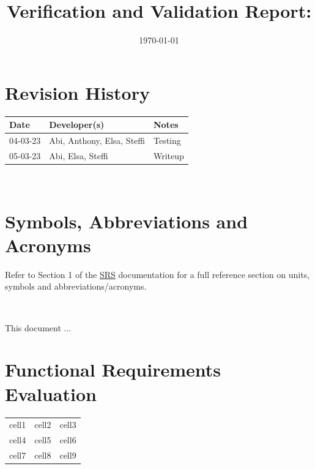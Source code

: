\documentclass[12pt, titlepage]{article}
\begin{document}
\title{Verification and Validation Report: \progname} 
\author{\authname}
\date{\today}
	
\maketitle


\section{Revision History}

\begin{tabularx}{\textwidth}{p{2cm}p{5cm}X}
\toprule {\bf Date} & {\bf Developer(s)} & {\bf Notes}\\
\midrule
04-03-23& Abi, Anthony, Elsa, Steffi & Testing\\
05-03-23& Abi, Elsa, Steffi & Writeup\\
\bottomrule
\end{tabularx}

~\newpage

\section{Symbols, Abbreviations and Acronyms}

Refer to Section 1 of the \href{https://github.com/NevoAbigail/Capstone/blob/main/docs/SRS/SRS.pdf}{SRS} documentation for a full reference section on units, symbols and abbreviations/acronyms.

\-\



\newpage

\tableofcontents

\listoftables %

\listoffigures %

\newpage


This document ...

\section{Functional Requirements Evaluation}

\begin{center}
\begin{tabular}{ |c|c|c| } 
 \hline
 cell1 & cell2 & cell3 \\ 
 cell4 & cell5 & cell6 \\ 
 cell7 & cell8 & cell9 \\ 
 \hline
\end{tabular}
\end{center}
\end{document}
